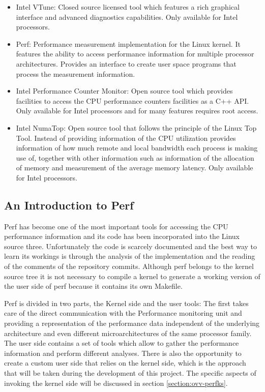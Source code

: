 \begin{itemize}
	\item Intel VTune: Closed source licensed tool which features a rich graphical interface and advanced diagnostics capabilities. Only available for Intel processors.
\item Perf: Performance measurement implementation for the Linux kernel. It features the ability to access performance information for multiple processor architectures. Provides an interface to create user space programs that process the measurement information.
\item Intel Performance Counter Monitor: Open source tool which provides facilities to access the CPU performance counters facilities as a C++ API. Only available for Intel processors and for many features requires root access.
\item Intel NumaTop: Open source tool that follows the principle of the Linux Top Tool. Instead of providing information of the CPU utilization provides information of how much remote and local bandwidth each process is making use of, together with other information such as information of the allocation of memory and measurement of the average memory latency. Only available for Intel processors. 
\end{itemize}

\subsection{An Introduction to Perf }\label{subsection:intro-perf}

Perf has become one of the most important tools for accessing the CPU performance information and its code has been incorporated into the Linux source three. Unfortunately the code is scarcely documented and the best way to learn its workings is through the analysis of the implementation and the reading of the comments of the repository commits. Although perf belongs to the kernel source tree it is not necessary to compile a kernel to generate a working version of the user side of perf because it contains its own Makefile.

Perf is divided in two parts, the Kernel side and the user tools: The first takes care of the direct communication with the Performance monitoring unit and providing a representation of the performance data independent of the underlying architecture and even different microarchitectures of the same processor family. The user side contains a set of tools which allow to gather the performance information and perform different analyses. There is also the opportunity to create a custom user side that relies on the kernel side, which is the approach that will be taken during the development of this project. The specific aspects of invoking the kernel side will be discussed in section \ref{section:ovv-perfks}.

